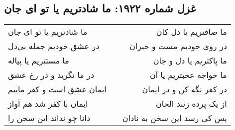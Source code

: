 \begin{center}
\section*{غزل شماره ۱۹۲۲: ما شادتریم یا تو ای جان}
\label{sec:1922}
\begin{longtable}{l p{0.5cm} r}
ما شادتریم یا تو ای جان
&&
ما صافتریم یا دل کان
\\
در عشق خودیم جمله بی‌دل
&&
در روی خودیم مست و حیران
\\
ما مستتریم یا پیاله
&&
ما پاکتریم یا دل و جان
\\
در ما نگرید و در رخ عشق
&&
ما خواجه عجبتریم یا آن
\\
ایمان عشق است و کفر ماییم
&&
در کفر نگه کن و در ایمان
\\
ایمان با کفر شد هم آواز
&&
از یک پرده زنند الحان
\\
دانا چو نداند این سخن را
&&
پس کی رسد این سخن به نادان
\\
\end{longtable}
\end{center}
